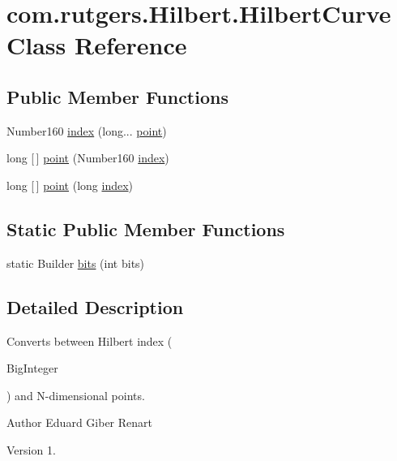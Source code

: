 \hypertarget{classcom_1_1rutgers_1_1Hilbert_1_1HilbertCurve}{}\section{com.\+rutgers.\+Hilbert.\+Hilbert\+Curve Class Reference}
\label{classcom_1_1rutgers_1_1Hilbert_1_1HilbertCurve}
\subsection*{Public Member Functions}
\begin{DoxyCompactItemize}
\item 
Number160 \hyperlink{classcom_1_1rutgers_1_1Hilbert_1_1HilbertCurve_acf26ba609b064facad3b7e74a3958978}{index} (long... \hyperlink{classcom_1_1rutgers_1_1Hilbert_1_1HilbertCurve_ad3b9f221c5c8e9bada057c09ecb4f8cd}{point})
\item 
long \mbox{[}$\,$\mbox{]} \hyperlink{classcom_1_1rutgers_1_1Hilbert_1_1HilbertCurve_ad3b9f221c5c8e9bada057c09ecb4f8cd}{point} (Number160 \hyperlink{classcom_1_1rutgers_1_1Hilbert_1_1HilbertCurve_acf26ba609b064facad3b7e74a3958978}{index})
\item 
long \mbox{[}$\,$\mbox{]} \hyperlink{classcom_1_1rutgers_1_1Hilbert_1_1HilbertCurve_ac7eecda9bbcd50896e9d16d04fcbc936}{point} (long \hyperlink{classcom_1_1rutgers_1_1Hilbert_1_1HilbertCurve_acf26ba609b064facad3b7e74a3958978}{index})
\end{DoxyCompactItemize}
\subsection*{Static Public Member Functions}
\begin{DoxyCompactItemize}
\item 
static Builder \hyperlink{classcom_1_1rutgers_1_1Hilbert_1_1HilbertCurve_a4393620f0fcf8591df040ceaeb55e756}{bits} (int bits)
\end{DoxyCompactItemize}


\subsection{Detailed Description}
Converts between Hilbert index (
\begin{DoxyCode}
BigInteger 
\end{DoxyCode}
 ) and N-\/dimensional points.

\begin{DoxyAuthor}{Author}
Eduard Giber Renart 
\end{DoxyAuthor}
\begin{DoxyVersion}{Version}
1. 
\end{DoxyVersion}


